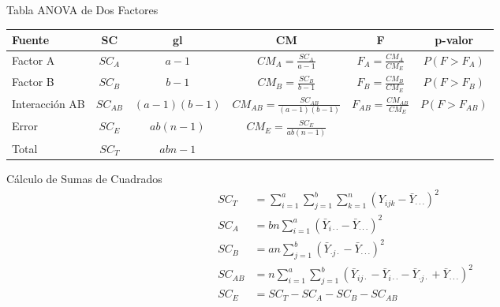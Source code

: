 \documentclass[aspectratio=169]{beamer}
\begin{document}
\begin{frame}{Tabla ANOVA de Dos Factores}
\small
\begin{table}
\begin{tabular}{lccccc}
\toprule
\textbf{Fuente} & \textbf{SC} & \textbf{gl} & \textbf{CM} & \textbf{F} & \textbf{p-valor} \\
\midrule
Factor A & $SC_A$ & $a-1$ & $CM_A = \frac{SC_A}{a-1}$ & $F_A = \frac{CM_A}{CM_E}$ & $P(F > F_A)$ \\[0.3cm]
Factor B & $SC_B$ & $b-1$ & $CM_B = \frac{SC_B}{b-1}$ & $F_B = \frac{CM_B}{CM_E}$ & $P(F > F_B)$ \\[0.3cm]
Interacción AB & $SC_{AB}$ & $(a-1)(b-1)$ & $CM_{AB} = \frac{SC_{AB}}{(a-1)(b-1)}$ & $F_{AB} = \frac{CM_{AB}}{CM_E}$ & $P(F > F_{AB})$ \\[0.3cm]
Error & $SC_E$ & $ab(n-1)$ & $CM_E = \frac{SC_E}{ab(n-1)}$ & & \\[0.3cm]
\midrule
Total & $SC_T$ & $abn-1$ & & & \\
\bottomrule
\end{tabular}
\end{table}
\end{frame}

\begin{frame}{Cálculo de Sumas de Cuadrados}
\begin{align*}
SC_T &= \sum_{i=1}^{a}\sum_{j=1}^{b}\sum_{k=1}^{n} (Y_{ijk} - \bar{Y}_{\cdot\cdot\cdot})^2 \\[0.3cm]
SC_A &= bn\sum_{i=1}^{a} (\bar{Y}_{i\cdot\cdot} - \bar{Y}_{\cdot\cdot\cdot})^2 \\[0.3cm]
SC_B &= an\sum_{j=1}^{b} (\bar{Y}_{\cdot j\cdot} - \bar{Y}_{\cdot\cdot\cdot})^2 \\[0.3cm]
SC_{AB} &= n\sum_{i=1}^{a}\sum_{j=1}^{b} (\bar{Y}_{ij\cdot} - \bar{Y}_{i\cdot\cdot} - \bar{Y}_{\cdot j\cdot} + \bar{Y}_{\cdot\cdot\cdot})^2 \\[0.3cm]
SC_E &= SC_T - SC_A - SC_B - SC_{AB}
\end{align*}
\end{frame}
\end{document}
